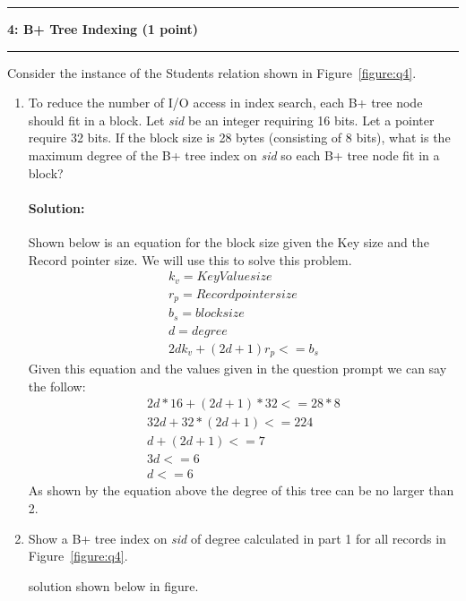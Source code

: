 \documentclass[11pt]{article}
\newcommand\question[2]{\vspace{.25in}\hrule\textbf{#1: #2}\vspace{.5em}\hrule\vspace{.10in}}
\begin{document}
\question{4}{B+ Tree Indexing (1 point)}
Consider the instance of the Students relation shown in Figure~\ref{figure:q4}. 
\begin{enumerate}
	
	\item To reduce the number of I/O access in index search, each B+ tree node should fit in a block. Let {\it sid} be an integer requiring 16 bits. Let a pointer require 32 bits.
	If the block size is 28 bytes (consisting of 8 bits), what is the maximum degree of the B+ tree index on {\it sid} so each B+ tree node fit in a block?
	
	\paragraph{Solution:} \hfill \break
	Shown below is an equation for the block size given the Key size and the Record pointer size. We will use this to solve this problem.\\
	
\begin{multline}
	k_v = Key Value size \\
	r_p = Record pointer size \\
	b_s = block size \\
	d = degree\\
	2d k_v + (2d + 1) r_p <= b_s 
\end{multline}
	Given this equation and the values given in the question prompt we can say the follow:\\
	
	\begin{multline}
		2d * 16 + (2d + 1) * 32 <= 28 * 8\\
		32d + 32*(2d + 1) <= 224\\
		d + (2d + 1) <= 7\\
		3d <= 6\\
		d <= 6
	\end{multline}
	As shown by the equation above the degree of this tree can be no larger than 2.\\
	

	\item Show a B+ tree index on {\it sid} of degree calculated in part 1 for all records in Figure~\ref{figure:q4}.
	
	solution shown below in figure.\\
	

\end{enumerate}
\end{document}
